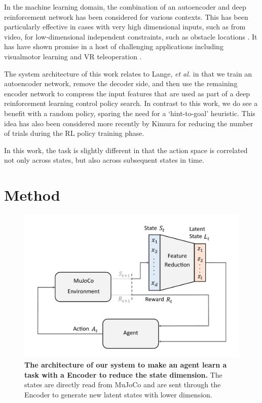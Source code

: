 \documentclass{article}
\begin{document}
In the machine learning domain, the combination of an autoencoder and deep reinforcement network has been considered for various contexts. 
This has been particularly effective in cases with very high dimensional inputs, such as from video, for low-dimensional independent constraints, such as obstacle locations \cite{finn2016deep,bitzer2010using,lynch2019learning}.  
It has have shown promise in a host of challenging applications including visualmotor learning \cite{finn2016deep} and VR teleoperation \cite{zhang2018deep}. 

The system architecture of this work relates to Lange, \emph{et al.} \cite{lange2010deep} in that we train an autoencoder network, remove the decoder side, and then use the remaining encoder network to compress the input features that are used as part of a deep reinforcement learning control policy search.
In contrast to this work, we do see a benefit with a random policy, sparing the need for a `hint-to-goal' heuristic.
This idea has also been considered more recently by Kimura \cite{kimura2018daqn} for reducing the number of trials during the RL policy training phase.  

In this work, the task is slightly different in that the action space is correlated not only across states, but also across subsequent states in time.  

\section{Method}

\begin{figure}[t]
    \centering
    \includegraphics[width=0.8\linewidth]{fig-system-arch}\vspace*{-12pt}
    \caption{
        \textbf{The architecture of our system to make an agent learn a task with a Encoder to reduce the state dimension.} The states are directly read from MuJoCo and are sent through the Encoder to generate new latent states with lower dimension.
    }
    \label{fig:system-arch}
\end{figure}
\end{document}
